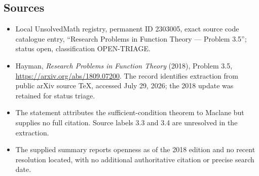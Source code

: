 \documentclass[11pt]{article}
\begin{document}
\subsection{Sources}
\begin{itemize}
\item Local UnsolvedMath registry, permanent ID 2303005, exact source code catalogue entry, ``Research Problems in Function Theory --- Problem 3.5''; status open, classification OPEN-TRIAGE.
\item Hayman, \emph{Research Problems in Function Theory} (2018), Problem 3.5, \url{https://arxiv.org/abs/1809.07200}. The record identifies extraction from public arXiv source TeX, accessed July 29, 2026; the 2018 update was retained for status triage.
\item The statement attributes the sufficient-condition theorem to Maclane but supplies no full citation. Source labels 3.3 and 3.4 are unresolved in the extraction.
\item The supplied summary reports openness as of the 2018 edition and no recent resolution located, with no additional authoritative citation or precise search date.
\end{itemize}
\end{document}
